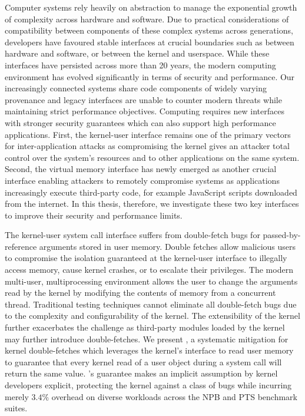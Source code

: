 Computer systems rely heavily on abstraction to manage the exponential
growth of complexity across hardware and software.
Due to practical considerations of compatibility between components of
these complex systems across generations, developers have favoured stable 
interfaces at crucial boundaries such as between hardware and software, 
or between the kernel and userspace.
While these interfaces have persisted across more than 20 years, the modern 
computing
environment has evolved significantly in terms of security and performance.
Our increasingly connected systems share code components of widely varying
provenance and legacy interfaces are unable to counter modern threats
while maintaining strict performance objectives.
Computing requires new interfaces with stronger security guarantees which
can also support high performance applications.
First, the kernel-user interface remains one of the primary vectors for 
inter-application attacks
as compromising the kernel gives an attacker total control over the system's 
resources and to other applications on the same system.
Second, the virtual memory interface has newly emerged as another crucial
interface enabling attackers to remotely compromise systems
as applications increasingly execute third-party code, 
for example JavaScript scripts downloaded from the internet.
In this thesis, therefore, we investigate these two key interfaces to 
improve their security and performance limits.

The kernel-user system call interface suffers from double-fetch
bugs for passed-by-reference arguments stored in user memory.
Double fetches allow malicious users to compromise the isolation guaranteed 
at the kernel-user interface to illegally access memory,
cause kernel crashes, or to escalate their privileges.
The modern multi-user, multiprocessing environment allows the user to
change the arguments read by the kernel by modifying
the contents of memory from a concurrent thread.
Traditional testing techniques cannot eliminate all double-fetch bugs due 
to the complexity and configurability of the kernel.
The extensibility of the kernel further exacerbates the challenge as 
third-party modules loaded by the kernel may further introduce double-fetches.
We present \midas, a systematic mitigation for kernel double-fetches which
leverages the kernel's interface to read user memory to guarantee that 
every kernel read of a user object during a system call will return the 
same value.
\midas's guarantee makes an implicit assumption by kernel developers
explicit, protecting the kernel against a class of bugs while incurring
merely $3.4\%$ overhead on diverse workloads across the NPB and PTS 
benchmark suites.


